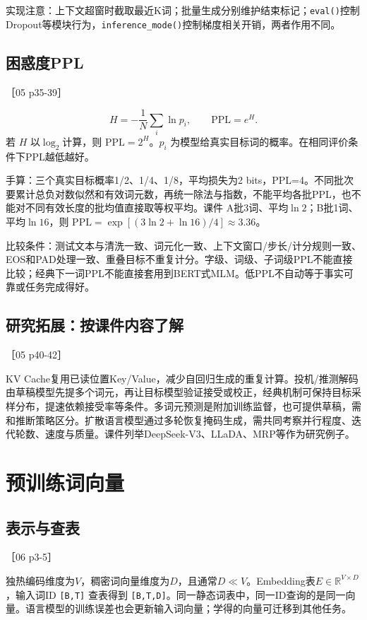 \documentclass[UTF8,a4paper,zihao=-4,fontset=windows]{ctexart}
\newcommand{\source}[1]{{\small #1}\par}
\begin{document}
实现注意：上下文超窗时截取最近K词；批量生成分别维护结束标记；\texttt{eval()}控制Dropout等模块行为，\texttt{inference\_mode()}控制梯度相关开销，两者作用不同。

\subsection{困惑度PPL}
\source{［05 p35-39］}
\[H=-\frac1N\sum_i\ln p_i,\qquad \mathrm{PPL}=e^H.\]
若 $H$ 以$\log_2$计算，则 $\mathrm{PPL}=2^H$。$p_i$ 为模型给真实目标词的概率。在相同评价条件下PPL越低越好。

手算：三个真实目标概率1/\allowbreak{}2、1/\allowbreak{}4、1/\allowbreak{}8，平均损失为2 bits，PPL=4。不同批次要累计总负对数似然和有效词元数，再统一除法与指数，不能平均各批PPL，也不能对不同有效长度的批均值直接取等权平均。课件 A批3词、平均$\ln2$；B批1词、平均$\ln16$，则 $\mathrm{PPL}=\exp[(3\ln2+\ln16)/4]\approx3.36$。

比较条件：测试文本与清洗一致、词元化一致、上下文窗口/\allowbreak{}步长/\allowbreak{}计分规则一致、EOS和PAD处理一致、重叠目标不重复计分。字级、词级、子词级PPL不能直接比较；经典下一词PPL不能直接套用到BERT式MLM。低PPL不自动等于事实可靠或任务完成得好。

\subsection{研究拓展：按课件内容了解}
\source{［05 p40-42］}
KV Cache复用已读位置Key/\allowbreak{}Value，减少自回归生成的重复计算。投机/\allowbreak{}推测解码由草稿模型先提多个词元，再让目标模型验证接受或校正，经典机制可保持目标采样分布，提速依赖接受率等条件。多词元预测是附加训练监督，也可提供草稿，需和推断策略区分。扩散语言模型通过多轮恢复掩码生成，需共同考察并行程度、迭代轮数、速度与质量。课件列举DeepSeek-V3、LLaDA、MRP等作为研究例子。

\section{预训练词向量}
\subsection{表示与查表}
\source{［06 p3-5］}
独热编码维度为$V$，稠密词向量维度为$D$，且通常$D\ll V$。Embedding表$E\in\mathbb R^{V\times D}$，输入词ID \texttt{[B,T]} 查表得到 \texttt{[B,T,D]}。同一静态词表中，同一ID查询的是同一向量。语言模型的训练误差也会更新输入词向量；学得的向量可迁移到其他任务。
\end{document}
